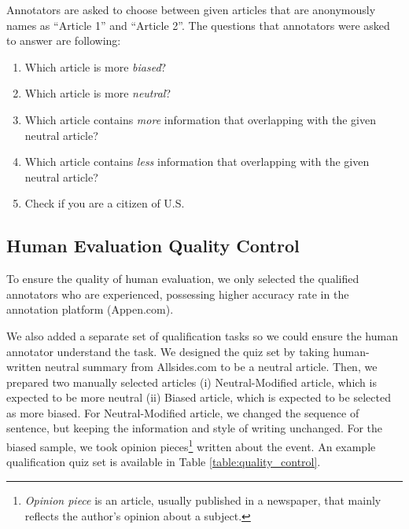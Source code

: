 \documentclass[11pt,a4paper]{article}
\begin{document}
Annotators are asked to choose between given articles that are anonymously names as ``Article 1'' and ``Article 2''. The questions that annotators were asked to answer are following:
\begin{enumerate}
   \item Which article is more \textit{biased}?
   \item Which article is more \textit{neutral}?
   \item Which article contains \textit{more} information that overlapping with the given neutral article?
   \item Which article contains \textit{less} information that overlapping with the given neutral article?
   \item Check if you are a citizen of U.S.
 \end{enumerate}


\subsection{Human Evaluation Quality Control}
To ensure the quality of human evaluation, we only selected the qualified annotators who are experienced, possessing higher accuracy rate in the annotation platform (Appen.com).

We also added a separate set of qualification tasks so we could ensure the human annotator understand the task. We designed the quiz set by taking human-written neutral summary from Allsides.com to be a neutral article. Then, we prepared two manually selected articles (i) Neutral-Modified article, which is expected to be more neutral (ii) Biased article, which is expected to be selected as more biased.
For Neutral-Modified article, we changed the sequence of sentence, but keeping the information and style of writing unchanged. For the biased sample, we took opinion pieces\footnote{\textit{Opinion piece} is an article, usually published in a newspaper, that mainly reflects the author's opinion about a subject.} written about the event. An example qualification quiz set is available in Table \ref{table:quality_control}. 
\end{document}
